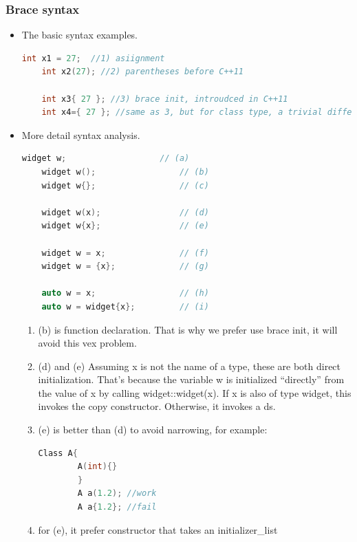 \documentclass[a4paper,12pt,twoside]{book}
\begin{document}
\subsubsection{Brace syntax}
\begin{itemize}
	
	\item The basic syntax examples. 
	\begin{lstlisting}[frame=single, language=c++,mathescape=true]
	int x1 = 27;  //1) asiignment
	int x2(27); //2) parentheses before C++11
	
	int x3{ 27 }; //3) brace init, introudced in C++11
	int x4={ 27 }; //same as 3, but for class type, a trivial difference. can't use it with explicit copy ctor( introduced before)
	\end{lstlisting}
	
	
	\item More detail syntax analysis.
	\begin{lstlisting}[frame=single, language=c++,mathescape=true]
	widget w;                   // (a)
	widget w();                 // (b)
	widget w{};                 // (c)
	
	widget w(x);                // (d)
	widget w{x};                // (e)
	
	widget w = x;               // (f)
	widget w = {x};             // (g)
	
	auto w = x;                 // (h)
	auto w = widget{x};         // (i)
	\end{lstlisting}
	
	\begin{enumerate}
		\item (b) is function declaration. That is why we prefer use brace init, it will avoid this vex problem.
		
		\item (d) and (e) Assuming x is not the name of a type, these are both direct initialization. That’s because the variable w is initialized “directly” from the value of x by calling widget::widget(x). If x is also of type widget, this invokes the copy constructor. Otherwise, it invokes a ds.
		
		\item (e) is better than (d) to avoid narrowing, for example:
		\begin{lstlisting}[frame=single, language=c++,mathescape=true]
		Class A{
		A(int){}
		}
		A a(1.2); //work
		A a{1.2}; //fail
		\end{lstlisting}
		\item for (e), it prefer constructor that takes an initializer\_list
		

\end{enumerate}
\end{itemize}
\end{document}
